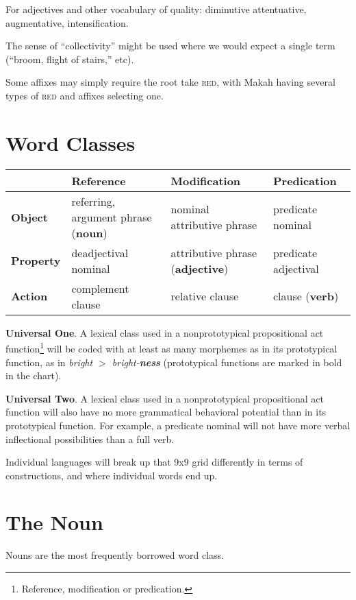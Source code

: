 \documentclass[11pt]{article}
\newcommand{\LL}[1]{\textbf{#1}}  %
\newcommand{\I}[1]{\textsc{#1}}   %
\begin{document}
For adjectives and other vocabulary of quality: diminutive
attentuative, augmentative, intensification.

The sense of ``collectivity'' might be used where we would expect a
single term (``broom, flight of stairs,'' etc).

Some affixes may simply require the root take \I{red}, with Makah
having several types of \I{red} and affixes selecting one.


\section{Word Classes}

\begin{center}
  \small
  \begin{tabular}{|l|l|l|l|}
    \hline
    & \LL{Reference} & \LL{Modification} & \LL{Predication} \\
    \hline
\LL{Object} & referring, argument phrase (\LL{noun}) & nominal attributive phrase &
                                                                   predicate
                                                                   nominal \\
    \hline
\LL{Property} & deadjectival nominal & attributive phrase (\LL{adjective}) & predicate adjectival\\
    \hline
\LL{Action} & complement clause & relative clause & clause (\LL{verb})\\
    \hline
  \end{tabular}
\end{center}

\LL{Universal One}. A lexical class used in a nonprototypical
propositional act function\footnote{Reference, modification or
predication.} will be coded with at least as many morphemes as in
its prototypical function, as in \textit{bright $>$ bright-\LL{ness}}
(prototypical functions are marked in bold in the chart).

\LL{Universal Two}. A lexical class used in a nonprototypical
propositional act function will also have no more grammatical
behavioral potential than in its prototypical function. For example, a
predicate nominal will not have more verbal inflectional possibilities
than a full verb.

Individual languages will break up that 9x9 grid differently in terms
of constructions, and where individual words end up.


\section{The Noun}
Nouns are the most frequently borrowed word class.
\end{document}
